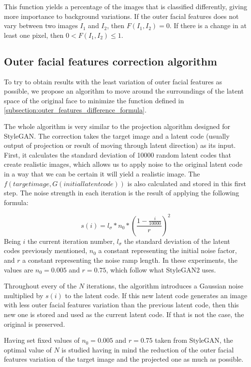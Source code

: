 \documentclass[review]{elsarticle}
\begin{document}
This function yields a percentage of the images that is classified differently, giving more importance to background variations. If the outer facial features does not vary between two images $I_1$ and $I_2$, then $F(I_1, I_2)=0$. If there is a change in at least one pixel, then $0 < F(I_1, I_2) \leq 1$.

\subsection{Outer facial features correction algorithm}\label{subsection:outer_features_correction_algorithm}

To try to obtain results with the least variation of outer facial features as possible, we propose an algorithm to move around the surroundings of the latent space of the original face to minimize the function defined in \ref{subsection:outer_features_difference_formula}. 

The whole algorithm is very similar to the projection algorithm designed for StyleGAN. The correction takes the target image and a latent code (usually output of projection or result of moving through latent direction) as its input. First, it calculates the standard deviation of 10000 random latent codes that create realistic images, which allows us to apply noise to the original latent code in a way that we can be certain it will yield a realistic image. The $f(target image, G(initial latent code))$ is also calculated and stored in this first step. The noise strength in each iteration is the result of applying the following formula:

\begin{equation}
s(i) = l_{\sigma} * n_0 * (\frac{1-\frac{i}{10000}}{r}) ^{2}
\end{equation}
Being $i$ the current iteration number, $l_{\sigma}$ the standard deviation of the latent codes previously mentioned, $n_0$ a constant representing the initial noise factor, and $r$ a constant representing the noise ramp length. In these experiments, the values are $n_0 = 0.005$ and $r = 0.75$, which follow what StyleGAN2 uses.

Throughout every of the $N$ iterations, the algorithm introduces a Gaussian noise multiplied by $s(i)$ to the latent code. If this new latent code generates an image with less outer facial features variation than the previous latent code, then this new one is stored and used as the current latent code. If that is not the case, the original is preserved. 

Having set fixed values of $n_0 = 0.005$ and $r = 0.75$ taken from StyleGAN, the optimal value of $N$ is studied having in mind the reduction of the outer facial features variation of the target image and the projected one as much as possible.
\end{document}
